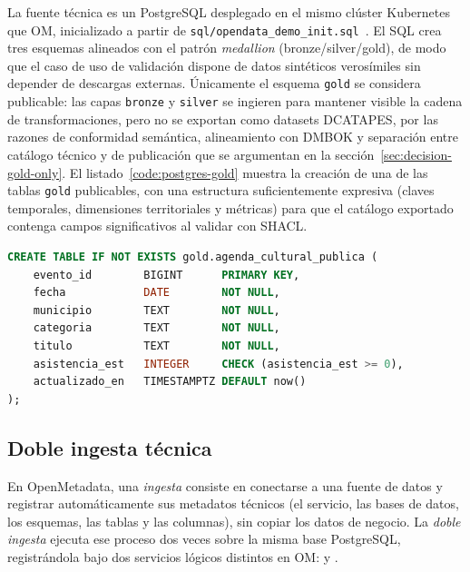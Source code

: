 La fuente técnica es un PostgreSQL desplegado en el mismo clúster Kubernetes que \ac{OM}, inicializado a partir de \texttt{sql/opendata\_demo\_init.sql}~\cite{postgresqlDocs}. El \ac{SQL} crea tres esquemas alineados con el patrón \emph{medallion} (bronze/silver/gold), de modo que el caso de uso de validación dispone de datos sintéticos verosímiles sin depender de descargas externas. Únicamente el esquema \texttt{gold} se considera publicable: las capas \texttt{bronze} y \texttt{silver} se ingieren para mantener visible la cadena de transformaciones, pero no se exportan como datasets \ac{DCATAPES}, por las razones de conformidad semántica, alineamiento con \ac{DMBOK} y separación entre catálogo técnico y de publicación que se argumentan en la sección~\ref{sec:decision-gold-only}. El listado~\ref{code:postgres-gold} muestra la creación de una de las tablas \texttt{gold} publicables, con una estructura suficientemente expresiva (claves temporales, dimensiones territoriales y métricas) para que el catálogo exportado contenga campos significativos al validar con \ac{SHACL}.

\begin{lstlisting}[language=SQL, caption={Fragmento de \texttt{sql/opendata\_demo\_init.sql}: tabla publicable de la capa gold.}, label=code:postgres-gold, captionpos=b]
CREATE TABLE IF NOT EXISTS gold.agenda_cultural_publica (
    evento_id        BIGINT      PRIMARY KEY,
    fecha            DATE        NOT NULL,
    municipio        TEXT        NOT NULL,
    categoria        TEXT        NOT NULL,
    titulo           TEXT        NOT NULL,
    asistencia_est   INTEGER     CHECK (asistencia_est >= 0),
    actualizado_en   TIMESTAMPTZ DEFAULT now()
);
\end{lstlisting}

\subsection{Doble ingesta técnica}\label{sec:implementacion-ingesta}

En OpenMetadata, una \emph{ingesta} consiste en conectarse a una fuente de datos y registrar automáticamente sus metadatos técnicos (el servicio, las bases de datos, los esquemas, las tablas y las columnas), sin copiar los datos de negocio. La \emph{doble ingesta} ejecuta ese proceso dos veces sobre la misma base PostgreSQL, registrándola bajo dos servicios lógicos distintos en \ac{OM}:  y .

